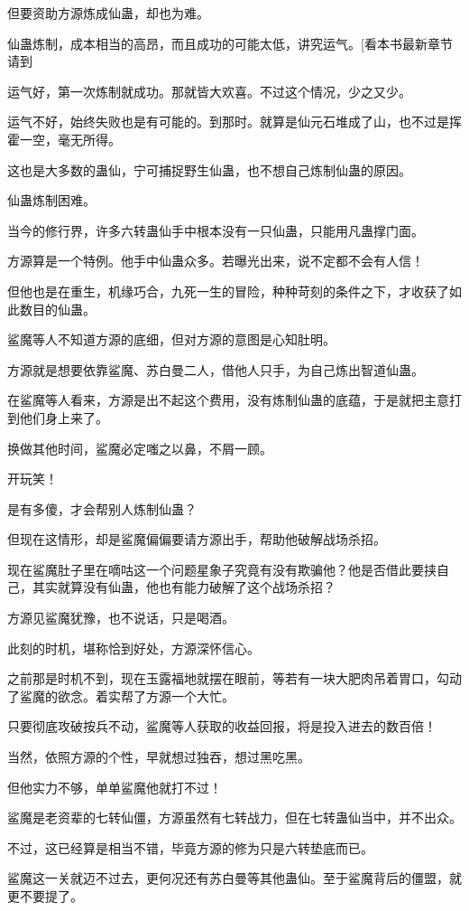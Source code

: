 \begin{this_body}
但要资助方源炼成仙蛊，却也为难。

仙蛊炼制，成本相当的高昂，而且成功的可能太低，讲究运气。[看本书最新章节请到

运气好，第一次炼制就成功。那就皆大欢喜。不过这个情况，少之又少。

运气不好，始终失败也是有可能的。到那时。就算是仙元石堆成了山，也不过是挥霍一空，毫无所得。

这也是大多数的蛊仙，宁可捕捉野生仙蛊，也不想自己炼制仙蛊的原因。

仙蛊炼制困难。

当今的修行界，许多六转蛊仙手中根本没有一只仙蛊，只能用凡蛊撑门面。

方源算是一个特例。他手中仙蛊众多。若曝光出来，说不定都不会有人信！

但他也是在重生，机缘巧合，九死一生的冒险，种种苛刻的条件之下，才收获了如此数目的仙蛊。

鲨魔等人不知道方源的底细，但对方源的意图是心知肚明。

方源就是想要依靠鲨魔、苏白曼二人，借他人只手，为自己炼出智道仙蛊。

在鲨魔等人看来，方源是出不起这个费用，没有炼制仙蛊的底蕴，于是就把主意打到他们身上来了。

换做其他时间，鲨魔必定嗤之以鼻，不屑一顾。

开玩笑！

是有多傻，才会帮别人炼制仙蛊？

但现在这情形，却是鲨魔偏偏要请方源出手，帮助他破解战场杀招。

现在鲨魔肚子里在嘀咕这一个问题星象子究竟有没有欺骗他？他是否借此要挟自己，其实就算没有仙蛊，他也有能力破解了这个战场杀招？

方源见鲨魔犹豫，也不说话，只是喝酒。

此刻的时机，堪称恰到好处，方源深怀信心。

之前那是时机不到，现在玉露福地就摆在眼前，等若有一块大肥肉吊着胃口，勾动了鲨魔的欲念。着实帮了方源一个大忙。

只要彻底攻破按兵不动，鲨魔等人获取的收益回报，将是投入进去的数百倍！

当然，依照方源的个性，早就想过独吞，想过黑吃黑。

但他实力不够，单单鲨魔他就打不过！

鲨魔是老资辈的七转仙僵，方源虽然有七转战力，但在七转蛊仙当中，并不出众。

不过，这已经算是相当不错，毕竟方源的修为只是六转垫底而已。

鲨魔这一关就迈不过去，更何况还有苏白曼等其他蛊仙。至于鲨魔背后的僵盟，就更不要提了。


\end{this_body}
